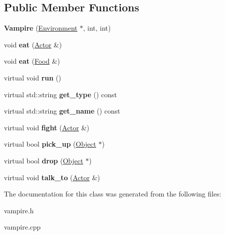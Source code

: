 \subsection*{Public Member Functions}
\begin{DoxyCompactItemize}
\item 
\hypertarget{classda__game_1_1Vampire_adfcf52e1ba7a0344f9d794c06a18da86}{
{\bfseries Vampire} (\hyperlink{classda__game_1_1Environment}{Environment} $\ast$, int, int)}
\label{classda__game_1_1Vampire_adfcf52e1ba7a0344f9d794c06a18da86}

\item 
\hypertarget{classda__game_1_1Vampire_a098285187dd2b419c4203fc871d41301}{
void {\bfseries eat} (\hyperlink{classda__game_1_1Actor}{Actor} \&)}
\label{classda__game_1_1Vampire_a098285187dd2b419c4203fc871d41301}

\item 
\hypertarget{classda__game_1_1Vampire_a67a45b375b34dcae9279f10a80c251cf}{
void {\bfseries eat} (\hyperlink{classda__game_1_1Food}{Food} \&)}
\label{classda__game_1_1Vampire_a67a45b375b34dcae9279f10a80c251cf}

\item 
\hypertarget{classda__game_1_1Vampire_aa026ac29df5be82f7305229780436621}{
virtual void {\bfseries run} ()}
\label{classda__game_1_1Vampire_aa026ac29df5be82f7305229780436621}

\item 
\hypertarget{classda__game_1_1Vampire_ae94c70e1a63a58ad3d5d77e4f0867200}{
virtual std::string {\bfseries get\_\-type} () const }
\label{classda__game_1_1Vampire_ae94c70e1a63a58ad3d5d77e4f0867200}

\item 
\hypertarget{classda__game_1_1Vampire_a461a139a2ba6c4f0714dc4824a132753}{
virtual std::string {\bfseries get\_\-name} () const }
\label{classda__game_1_1Vampire_a461a139a2ba6c4f0714dc4824a132753}

\item 
\hypertarget{classda__game_1_1Vampire_ab1826abb3ee4542d631e49241dbbb4cb}{
virtual void {\bfseries fight} (\hyperlink{classda__game_1_1Actor}{Actor} \&)}
\label{classda__game_1_1Vampire_ab1826abb3ee4542d631e49241dbbb4cb}

\item 
\hypertarget{classda__game_1_1Vampire_a8df4e15d9f5b49598a238fd9a626ad9c}{
virtual bool {\bfseries pick\_\-up} (\hyperlink{classda__game_1_1Object}{Object} $\ast$)}
\label{classda__game_1_1Vampire_a8df4e15d9f5b49598a238fd9a626ad9c}

\item 
\hypertarget{classda__game_1_1Vampire_a49dcdd308b3e5a6865b4eb46c5d9f0fb}{
virtual bool {\bfseries drop} (\hyperlink{classda__game_1_1Object}{Object} $\ast$)}
\label{classda__game_1_1Vampire_a49dcdd308b3e5a6865b4eb46c5d9f0fb}

\item 
\hypertarget{classda__game_1_1Vampire_ae435892f6850a3e3fab698e35203149c}{
virtual void {\bfseries talk\_\-to} (\hyperlink{classda__game_1_1Actor}{Actor} \&)}
\label{classda__game_1_1Vampire_ae435892f6850a3e3fab698e35203149c}

\end{DoxyCompactItemize}


The documentation for this class was generated from the following files:\begin{DoxyCompactItemize}
\item 
vampire.h\item 
vampire.cpp\end{DoxyCompactItemize}
